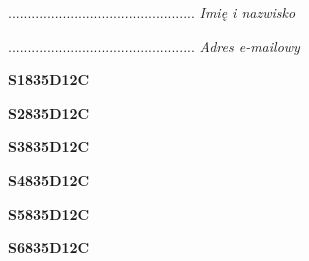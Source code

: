 \begin{turn}{90}\begin{minipage}{\linewidth} \vspace{20mm} ................................................  \textit{Imię i nazwisko}\end{minipage}\end{turn}

\begin{turn}{90}\begin{minipage}{\linewidth} \vspace{20mm} ................................................  \textit{Adres e-mailowy}\end{minipage}\end{turn}

\begin{turn}{90}\huge \begin{minipage}{\linewidth} \vspace{10mm}\textbf{S1835D12C}\end{minipage}\end{turn}

\begin{turn}{90}\huge \begin{minipage}{\linewidth} \vspace{10mm}\textbf{S2835D12C}\end{minipage}\end{turn}

\begin{turn}{90}\huge \begin{minipage}{\linewidth} \vspace{10mm}\textbf{S3835D12C}\end{minipage}\end{turn}

\begin{turn}{90}\huge \begin{minipage}{\linewidth} \vspace{10mm}\textbf{S4835D12C}\end{minipage}\end{turn}

\begin{turn}{90}\huge \begin{minipage}{\linewidth} \vspace{10mm}\textbf{S5835D12C}\end{minipage}\end{turn}

\begin{turn}{90}\huge \begin{minipage}{\linewidth} \vspace{10mm}\textbf{S6835D12C}\end{minipage}\end{turn}

